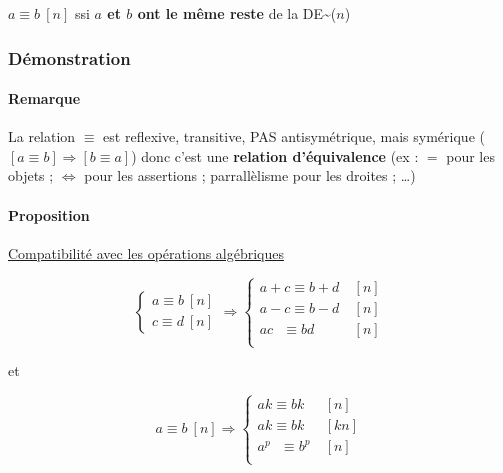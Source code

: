 \documentclass{report}
\begin{document}
        $a\equiv b ~[n]$ ssi \textbf{$a$ et $b$ ont le même reste} de la DE\textasciitilde($n$)

      \subsubsection{Démonstration}

        \begin{tcolorbox}[colback=white, colframe=black, boxrule=0.8pt, width=1\textwidth]

        \end{tcolorbox}

      \paragraph{Remarque}

        La relation $\equiv$ est reflexive, transitive, PAS antisymétrique, mais symérique ($\left[a\equiv b\right] \Rightarrow \left[b\equiv a\right]$) donc c'est une \textbf{relation d'équivalence} (ex : $=$ pour les objets ; $\iff$ pour les assertions ; parrallèlisme pour les droites ; \dots)

      \paragraph{Proposition} \underline{Compatibilité avec les opérations algébriques}

        \[\begin{cases}
          a\equiv b ~[n]\\
          c\equiv d ~[n]
        \end{cases}
        \Rightarrow
        \begin{cases}
          a+c \equiv b+d ~&[n]\\
          a-c \equiv b-d ~&[n]\\
          ac ~~~\equiv bd ~&[n]\\
        \end{cases}\]

        et 

        \[a\equiv b ~[n]
        \Rightarrow
        \begin{cases}
          ak \equiv bk ~&[n]\\
          ak \equiv bk ~&[kn]\\
          a^p ~~~\equiv b^p ~&[n]\\
        \end{cases}\]
\end{document}
